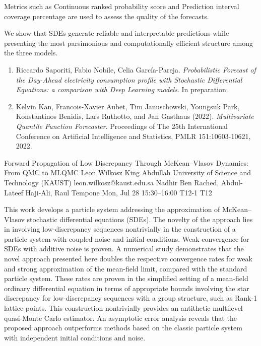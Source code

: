 \documentclass[12pt,lettersize,oneside]{book} %
\begin{document}
\begin{talk}
Metrics such as Continuous ranked probability score and Prediction interval coverage percentage are used to assess the quality of the forecasts. 

We show that SDEs generate reliable and interpretable predictions while presenting the most parsimonious and computationally efficient structure among the three models.


\medskip

 

\begin{enumerate}
    \item[{[1]}] Riccardo Saporiti, Fabio Nobile, Celia Garc\'ia-Pareja. {\it Probabilistic Forecast of the Day-Ahead electricity consumption profile with Stochastic Differential Equations: a comparison with Deep Learning models}. In preparation.

 \item[{[2]}] Kelvin Kan, Francois-Xavier Aubet, Tim Januschowski, Youngsuk Park, Konstantinos Benidis, Lars Ruthotto, and Jan Gasthaus (2022). {\it Multivariate Quantile Function Forecaster}. Proceedings of The 25th International Conference on Artificial Intelligence and Statistics, PMLR 151:10603-10621, 2022.
 
\end{enumerate}
 
\end{talk}

\begin{talk}
  {Forward Propagation of Low Discrepancy Through McKean--Vlasov Dynamics: From QMC to MLQMC}%
  {Leon Wilkosz}%
  {King Abdullah University of Science and Technology (KAUST)}%
  {leon.wilkosz@kaust.edu.sa}%
  {Nadhir Ben Rached, Abdul-Lateef Haji-Ali, Raul Tempone}%
  {}%
  {Mon, Jul 28 15:30--16:00}%
  {T12-1}%
  {T12}%
  
    
   
This work develops a particle system addressing the approximation of \linebreak McKean--Vlasov stochastic differential equations (SDEs). The novelty of the approach lies in involving low-discrepancy sequences nontrivially in the construction of a particle system with coupled noise and initial conditions. Weak convergence for SDEs with additive noise is proven. A numerical study demonstrates that the novel approach presented here doubles the respective convergence rates for weak and strong approximation of the mean-field limit, compared with the standard particle system. These rates are proven in the simplified setting of a mean-field ordinary differential equation in terms of appropriate bounds involving the star discrepancy for low-discrepancy sequences with a group structure, such as Rank-1 lattice points. This construction nontrivially provides an antithetic multilevel quasi-Monte Carlo estimator. An asymptotic error analysis reveals that the proposed approach outperforms methods based on the classic particle system with independent initial conditions and noise.
\end{talk}
\end{document}

